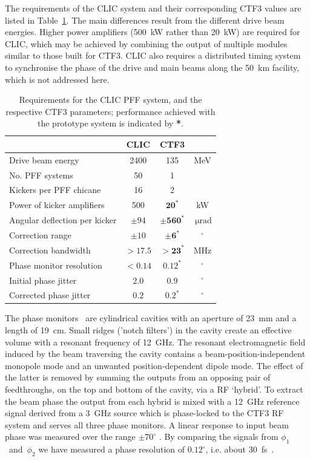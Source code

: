\documentclass[%
 reprint,
 superscriptaddress,
 amsmath,
 amssymb,
 prl,
]{revtex4-1}
\begin{document}
The requirements of the CLIC system and their corresponding CTF3 values are 
listed in Table~\ref{tab:pffspecs}. The main differences result from the 
different drive beam energies. Higher power 
amplifiers (500~kW rather than 20~kW) are required for CLIC, which may be 
achieved by combining the output of multiple modules similar to those built for 
CTF3.
CLIC also requires a distributed timing system to synchronise the phase of the 
drive and main beams along the 50~km facility, which is not addressed here.

\begin{table}
	\caption{\label{tab:pffspecs}
	    Requirements for the CLIC PFF system, and the respective CTF3 
	    parameters; performance achieved with the prototype system is indicated 
	    by \textbf{*}.}
\begin{ruledtabular}
	\begin{tabular}{lccc}
		 & CLIC & CTF3 \\
		\hline
		Drive beam energy & 2400 & 135 & MeV \\
		No. PFF systems & 50 & 1 & \\
		Kickers per PFF chicane & 16 & 2 & \\
		Power of kicker amplifiers & 500 & \(\mathbf{20^*}\) & kW \\
		Angular deflection per kicker & \(\pm94\) & 
		\(\mathbf{\pm560^*}\) & \(~\mathrm{\mu rad}\) \\
		Correction range & \(\pm 10\) & \(\mathbf{\pm 6^*}\) & \(^\circ\) \\
		Correction bandwidth & \(>17.5\) & \(\mathbf{>23^*}\) & MHz \\
		Phase monitor resolution & \(< 0.14\) & \(\mathbf{0.12^*}\) &  
		\(^\circ\)   \\
		Initial phase jitter & \(2.0\) & \(0.9\) &  \(^\circ\) \\
		Corrected phase jitter & \(0.2\) & \(\mathbf{0.2^*}\) &  \(^\circ\)  \\
	\end{tabular}
\end{ruledtabular}
\end{table}


The phase monitors~\cite{phMonEuCard} are cylindrical cavities with an aperture 
of 23~mm and a length of 19~cm. Small ridges (’notch filters’) in the cavity 
create an effective volume with a resonant frequency of 12~GHz. 
The resonant electromagnetic field induced by the beam traversing the cavity 
contains a beam-position-independent monopole mode and an unwanted 
position-dependent dipole mode. The 
effect of the latter is removed by summing the outputs from an opposing pair 
of feedthroughs, on the top and bottom of the cavity, via a RF ‘hybrid’. 
To extract the beam phase the output from each hybrid 
is mixed with a 12~GHz reference signal derived from a 3~GHz source which is 
phase-locked to the CTF3 RF system and serves all three phase monitors.
A linear response to input beam phase was measured over the range 
\(\pm70^\circ\) \cite{Skowron2013}. By comparing the signals from 
\(\phi_1\)~and~\(\phi_2\) we have measured a phase resolution of 
\(0.12^\circ\), i.e. about 30~fs~\cite{RobertsThesis}.
\end{document}
